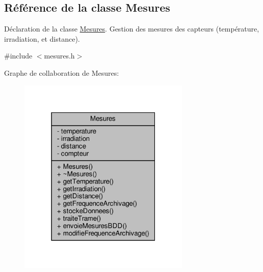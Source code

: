 \hypertarget{class_mesures}{}\subsection{Référence de la classe Mesures}
\label{class_mesures}


Déclaration de la classe \hyperlink{class_mesures}{Mesures}. Gestion des mesures des capteurs (température, irradiation, et distance).  




{\ttfamily \#include $<$mesures.\+h$>$}



Graphe de collaboration de Mesures\+:
\nopagebreak
\begin{figure}[H]
\begin{center}
\leavevmode
\includegraphics[width=232pt]{class_mesures__coll__graph}
\end{center}
\end{figure}
